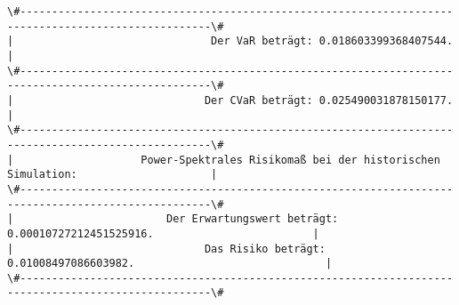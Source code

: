 \documentclass[paper=landscape]{scrartcl}
\begin{document}
    \begin{Verbatim}[commandchars=\\\{\}]
\#----------------------------------------------------------------------------------------------------\#
|                               Der VaR beträgt: 0.018603399368407544.                               | 
\#----------------------------------------------------------------------------------------------------\#
|                              Der CVaR beträgt: 0.025490031878150177.                               | 
\#----------------------------------------------------------------------------------------------------\#
|                    Power-Spektrales Risikomaß bei der historischen Simulation:                     | 
\#----------------------------------------------------------------------------------------------------\#
|                        Der Erwartungswert beträgt: 0.00010727212451525916.                         | 
|                              Das Risiko beträgt: 0.01008497086603982.                              | 
\#----------------------------------------------------------------------------------------------------\#

    \end{Verbatim}


    
    
    
    
\end{document}
